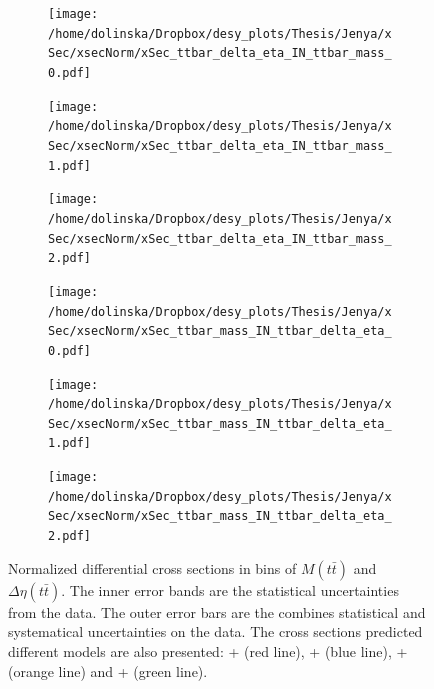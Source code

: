 \begin{figure}
\centering
\begin{subfigure}
  \centering
  \texttt{[image: /home/dolinska/Dropbox/desy\_plots/Thesis/Jenya/xSec/xsecNorm/xSec\_ttbar\_delta\_eta\_IN\_ttbar\_mass\_0.pdf]}
\end{subfigure}
\begin{subfigure}
  \centering
  \texttt{[image: /home/dolinska/Dropbox/desy\_plots/Thesis/Jenya/xSec/xsecNorm/xSec\_ttbar\_delta\_eta\_IN\_ttbar\_mass\_1.pdf]}
\end{subfigure}
\begin{subfigure}
  \centering
  \texttt{[image: /home/dolinska/Dropbox/desy\_plots/Thesis/Jenya/xSec/xsecNorm/xSec\_ttbar\_delta\_eta\_IN\_ttbar\_mass\_2.pdf]}
\end{subfigure}
\begin{subfigure}
  \centering
  \texttt{[image: /home/dolinska/Dropbox/desy\_plots/Thesis/Jenya/xSec/xsecNorm/xSec\_ttbar\_mass\_IN\_ttbar\_delta\_eta\_0.pdf]}
\end{subfigure}
\begin{subfigure}
  \centering
  \texttt{[image: /home/dolinska/Dropbox/desy\_plots/Thesis/Jenya/xSec/xsecNorm/xSec\_ttbar\_mass\_IN\_ttbar\_delta\_eta\_1.pdf]}
\end{subfigure}
\begin{subfigure}
  \centering
  \texttt{[image: /home/dolinska/Dropbox/desy\_plots/Thesis/Jenya/xSec/xsecNorm/xSec\_ttbar\_mass\_IN\_ttbar\_delta\_eta\_2.pdf]}
\end{subfigure}
\caption{Normalized differential cross sections in bins of $M(t\bar{t})$ and $\Delta\eta(t\bar{t})$. The inner error bands are the statistical uncertainties from the data.
         The outer error bars are the combines statistical and systematical uncertainties on the data. The cross sections predicted different models are also presented:
         \MG + \PYTHIA (red line), \Powheg + \PYTHIA (blue line), \Powheg + \HERWIG (orange line) and \MCNLO + \HERWIG (green line).}
\label{fig:XS_2D_eta_Mtt}
\end{figure}

